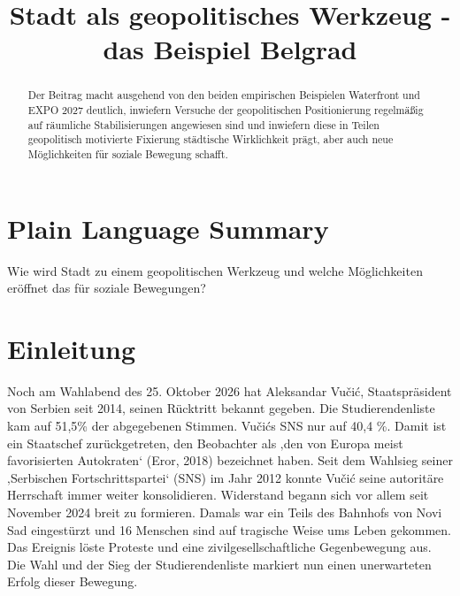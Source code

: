 \documentclass[
  ngerman,
]{agujournal2019}
\begin{document}
\title{Stadt als geopolitisches Werkzeug - das Beispiel Belgrad}



\begin{abstract}
Der Beitrag macht ausgehend von den beiden empirischen Beispielen
Waterfront und EXPO 2027 deutlich, inwiefern Versuche der geopolitischen
Positionierung regelmäßig auf räumliche Stabilisierungen angewiesen sind
und inwiefern diese in Teilen geopolitisch motivierte Fixierung
städtische Wirklichkeit prägt, aber auch neue Möglichkeiten für soziale
Bewegung schafft.
\end{abstract}

\section*{Plain Language Summary}
Wie wird Stadt zu einem geopolitischen Werkzeug und welche Möglichkeiten
eröffnet das für soziale Bewegungen?




\section{Einleitung}\label{einleitung}

Noch am Wahlabend des 25. Oktober 2026 hat Aleksandar Vučić,
Staatspräsident von Serbien seit 2014, seinen Rücktritt bekannt gegeben.
Die Studierendenliste kam auf 51,5\% der abgegebenen Stimmen. Vučićs SNS
nur auf 40,4 \%. Damit ist ein Staatschef zurückgetreten, den Beobachter
als ‚den von Europa meist favorisierten Autokraten` (Eror, 2018)
bezeichnet haben. Seit dem Wahlsieg seiner ‚Serbischen
Fortschrittspartei` (SNS) im Jahr 2012 konnte Vučić seine autoritäre
Herrschaft immer weiter konsolidieren. Widerstand begann sich vor allem
seit November 2024 breit zu formieren. Damals war ein Teils des Bahnhofs
von Novi Sad eingestürzt und 16 Menschen sind auf tragische Weise ums
Leben gekommen. Das Ereignis löste Proteste und eine
zivilgesellschaftliche Gegenbewegung aus. Die Wahl und der Sieg der
Studierendenliste markiert nun einen unerwarteten Erfolg dieser
Bewegung.
\end{document}

